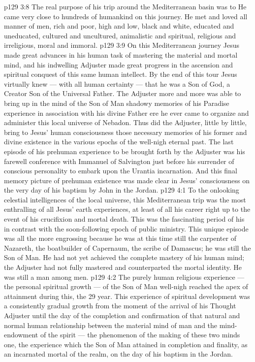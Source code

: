 \vs p129 3:8 The real purpose of his trip around the Mediterranean basin was to  He came very close to hundreds of humankind on this journey. He met and loved all manner of men, rich and poor, high and low, black and white, educated and uneducated, cultured and uncultured, animalistic and spiritual, religious and irreligious, moral and immoral.
\vs p129 3:9 On this Mediterranean journey Jesus made great advances in his human task of mastering the material and mortal mind, and his indwelling Adjuster made great progress in the ascension and spiritual conquest of this same human intellect. By the end of this tour Jesus virtually knew --- with all human certainty --- that he was a Son of God, a Creator Son of the Universal Father. The Adjuster more and more was able to bring up in the mind of the Son of Man shadowy memories of his Paradise experience in association with his divine Father ere he ever came to organize and administer this local universe of Nebadon. Thus did the Adjuster, little by little, bring to Jesus’ human consciousness those necessary memories of his former and divine existence in the various epochs of the well\hyp{}nigh eternal past. The last episode of his prehuman experience to be brought forth by the Adjuster was his farewell conference with Immanuel of Salvington just before his surrender of conscious personality to embark upon the Urantia incarnation. And this final memory picture of prehuman existence was made clear in Jesus’ consciousness on the very day of his baptism by John in the Jordan.
\vs p129 4:1 To the onlooking celestial intelligences of the local universe, this Mediterranean trip was the most enthralling of all Jesus’ earth experiences, at least of all his career right up to the event of his crucifixion and mortal death. This was the fascinating period of his  in contrast with the soon\hyp{}following epoch of public ministry. This unique episode was all the more engrossing because he was at this time still the carpenter of Nazareth, the boatbuilder of Capernaum, the scribe of Damascus; he was still the Son of Man. He had not yet achieved the complete mastery of his human mind; the Adjuster had not fully mastered and counterparted the mortal identity. He was still a man among men.
\vs p129 4:2 The purely human religious experience --- the personal spiritual growth --- of the Son of Man well\hyp{}nigh reached the apex of attainment during this, the 29 year. This experience of spiritual development was a consistently gradual growth from the moment of the arrival of his Thought Adjuster until the day of the completion and confirmation of that natural and normal human relationship between the material mind of man and the mind\hyp{}endowment of the spirit --- the phenomenon of the making of these two minds one, the experience which the Son of Man attained in completion and finality, as an incarnated mortal of the realm, on the day of his baptism in the Jordan.
